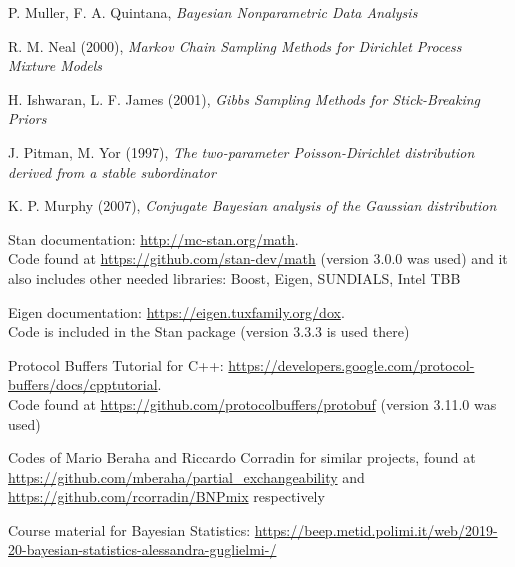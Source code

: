 \documentclass[a4paper]{report}
\begin{document}
\begin{thebibliography}{9}
	 P. Muller, F. A. Quintana, \textit{Bayesian Nonparametric Data Analysis}
	
	 R. M. Neal (2000), \textit{Markov Chain Sampling Methods for Dirichlet Process Mixture Models}
	
	 H. Ishwaran, L. F. James (2001), \textit{Gibbs Sampling Methods for Stick-Breaking Priors}
	
	 J. Pitman, M. Yor (1997), \textit{The two-parameter Poisson-Dirichlet distribution derived from a stable subordinator} 
	
	 K. P. Murphy (2007), \textit{Conjugate Bayesian analysis of the Gaussian distribution}
	
	 Stan documentation: \url{http://mc-stan.org/math}. \\
	Code found at \url{https://github.com/stan-dev/math} (version 3.0.0 was used) and it also includes other needed libraries: Boost, Eigen, SUNDIALS, Intel TBB
	
	 Eigen documentation: \url{https://eigen.tuxfamily.org/dox}. \\
	Code is included in the Stan package (version 3.3.3 is used there)
	
	 Protocol Buffers Tutorial for C++: \url{https://developers.google.com/protocol-buffers/docs/cpptutorial}. \\
	Code found at \url{https://github.com/protocolbuffers/protobuf} (version 3.11.0 was used)
	
	 Codes of Mario Beraha and Riccardo Corradin for similar projects, found at \url{https://github.com/mberaha/partial_exchangeability} and \url{https://github.com/rcorradin/BNPmix} respectively
	
	 Course material for Bayesian Statistics: \url{https://beep.metid.polimi.it/web/2019-20-bayesian-statistics-alessandra-guglielmi-/}
\end{thebibliography}
\end{document}
